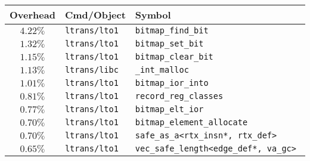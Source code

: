 \begin{tabular}{|c|l|l|}\hline Overhead & Cmd/Object & Symbol \\  \hline
\hline$4.22\%$ & \tt ltrans\hfill/lto1 & \tt bitmap\_find\_bit \\
\hline $1.32\%$ & \tt ltrans\hfill/lto1 & \tt bitmap\_set\_bit \\
\hline $1.15\%$ & \tt ltrans\hfill/lto1 & \tt bitmap\_clear\_bit \\
\hline $1.13\%$ & \tt ltrans\hfill/libc & \tt \_int\_malloc \\
\hline $1.01\%$ & \tt ltrans\hfill/lto1 & \tt bitmap\_ior\_into \\
\hline $0.81\%$ & \tt ltrans\hfill/lto1 & \tt record\_reg\_classes \\
\hline $0.77\%$ & \tt ltrans\hfill/lto1 & \tt bitmap\_elt\_ior \\
\hline $0.70\%$ & \tt ltrans\hfill/lto1 & \tt bitmap\_element\_allocate \\
\hline $0.70\%$ & \tt ltrans\hfill/lto1 & \tt safe\_as\_a<rtx\_insn*, rtx\_def> \\
\hline $0.65\%$ & \tt ltrans\hfill/lto1 & \tt vec\_safe\_length<edge\_def*, va\_gc> \\
\hline \end{tabular}
